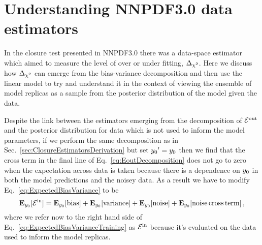 \section{Understanding NNPDF3.0 data estimators}

In the closure test presented in NNPDF3.0 \cite{nnpdf30} there was a data-space
estimator which aimed to measure the level of over or under fitting, $\Delta_{\chi^2}$.
Here we discuss how $\Delta_{\chi^2}$ can emerge from the bias-variance decomposition
and then use the linear model to try and understand it in the context of
viewing the ensemble of model replicas as a sample from the posterior distribution
of the model given the data.

Despite the link between the estimators emerging from the decomposition of
$\mathcal{E}^{\rm out}$ and the posterior distribution for data which is not used to inform
the model parameters, if we perform the same decomposition as in
Sec.~\ref{sec:ClosureEstimatorsDerivation} but set
${{y_0}^{\prime}}=y_0$ then we find that the cross term
in the final line of Eq.~\ref{eq:EoutDecomposition} does not go to zero when
the expectation across data is taken because there is a dependence on
$y_0$ in both the model predictions and the noisey data. As a result
we have to modify Eq.~\ref{eq:ExpectedBiasVariance} to be
\begin{equation}\label{eq:ExpectedBiasVarianceTraining}
    \mathbf{E}_{y_0}[\mathcal{E}^{\rm in}] =
    \mathbf{E}_{y_0}[{\rm bias}] + 
    \mathbf{E}_{y_0}[{\rm variance}] +
    \mathbf{E}_{y_0}[{\rm noise}] +
    \mathbf{E}_{y_0}[{\rm noise \, cross \, term}]\, ,
\end{equation}
where we refer now to the right hand side of
Eq.~\ref{eq:ExpectedBiasVarianceTraining} as $\mathcal{E}^{\rm in}$ because it's evaluated on the
data used to inform the model replicas.

